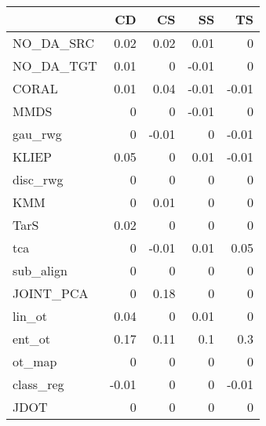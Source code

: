 \begin{tabular}{lrrrr}
\hline
           &    CD &    CS &    SS &    TS \\
\hline
 NO\_DA\_SRC &  0.02 &  0.02 &  0.01 &  0    \\
 NO\_DA\_TGT &  0.01 &  0    & -0.01 &  0    \\
 CORAL     &  0.01 &  0.04 & -0.01 & -0.01 \\
 MMDS      &  0    &  0    & -0.01 &  0    \\
 gau\_rwg   &  0    & -0.01 &  0    & -0.01 \\
 KLIEP     &  0.05 &  0    &  0.01 & -0.01 \\
 disc\_rwg  &  0    &  0    &  0    &  0    \\
 KMM       &  0    &  0.01 &  0    &  0    \\
 TarS      &  0.02 &  0    &  0    &  0    \\
 tca       &  0    & -0.01 &  0.01 &  0.05 \\
 sub\_align &  0    &  0    &  0    &  0    \\
 JOINT\_PCA &  0    &  0.18 &  0    &  0    \\
 lin\_ot    &  0.04 &  0    &  0.01 &  0    \\
 ent\_ot    &  0.17 &  0.11 &  0.1  &  0.3  \\
 ot\_map    &  0    &  0    &  0    &  0    \\
 class\_reg & -0.01 &  0    &  0    & -0.01 \\
 JDOT      &  0    &  0    &  0    &  0    \\
\hline
\end{tabular}